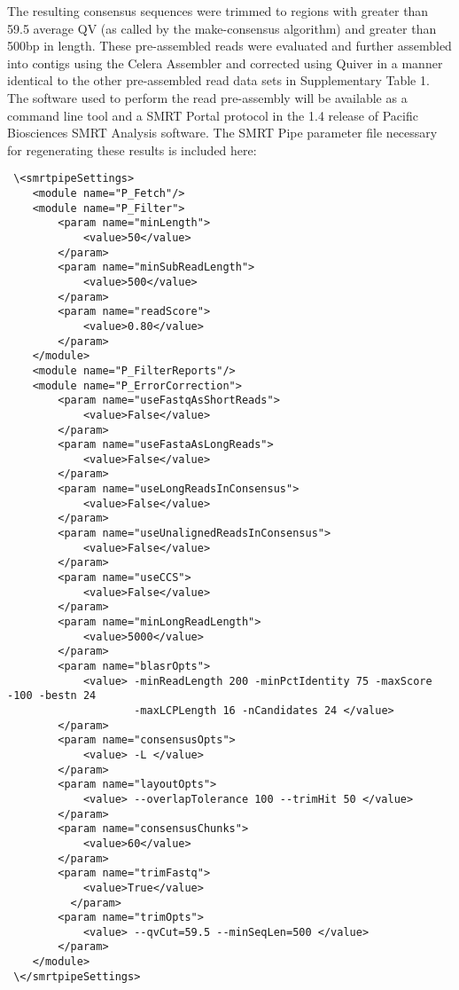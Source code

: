 \documentclass[11pt]{article}
\begin{document}
The resulting consensus sequences were trimmed to regions with greater than 59.5 average QV (as called by the make-consensus algorithm) and greater than 500bp in length. These pre-assembled reads were evaluated and further assembled into contigs using the Celera Assembler and corrected using Quiver in a manner identical to the other pre-assembled read data sets in Supplementary Table 1. The software used to perform the read pre-assembly will be available as a command line tool and a SMRT Portal protocol in the 1.4 release of Pacific Biosciences SMRT Analysis software. The SMRT Pipe parameter file necessary for regenerating these results is included here:

\begin{verbatim}
 \<smrtpipeSettings>
    <module name="P_Fetch"/>
    <module name="P_Filter">
        <param name="minLength">
            <value>50</value>
        </param>
        <param name="minSubReadLength">
            <value>500</value>
        </param>
        <param name="readScore">
            <value>0.80</value>
        </param>
    </module>
    <module name="P_FilterReports"/>
    <module name="P_ErrorCorrection">
        <param name="useFastqAsShortReads">
            <value>False</value>
        </param>
        <param name="useFastaAsLongReads">
            <value>False</value>
        </param>
        <param name="useLongReadsInConsensus">
            <value>False</value>
        </param>
        <param name="useUnalignedReadsInConsensus">
            <value>False</value>
        </param>
        <param name="useCCS">
            <value>False</value>
        </param>
        <param name="minLongReadLength">
            <value>5000</value>
        </param>
        <param name="blasrOpts">
            <value> -minReadLength 200 -minPctIdentity 75 -maxScore -100 -bestn 24 
                    -maxLCPLength 16 -nCandidates 24 </value>
        </param>
        <param name="consensusOpts">
            <value> -L </value>
        </param>
        <param name="layoutOpts">
            <value> --overlapTolerance 100 --trimHit 50 </value>
        </param>
        <param name="consensusChunks">
            <value>60</value>
        </param>
        <param name="trimFastq">
            <value>True</value>
          </param>
        <param name="trimOpts">
            <value> --qvCut=59.5 --minSeqLen=500 </value>
        </param>
    </module>
 \</smrtpipeSettings>
\end{verbatim}
\end{document}
